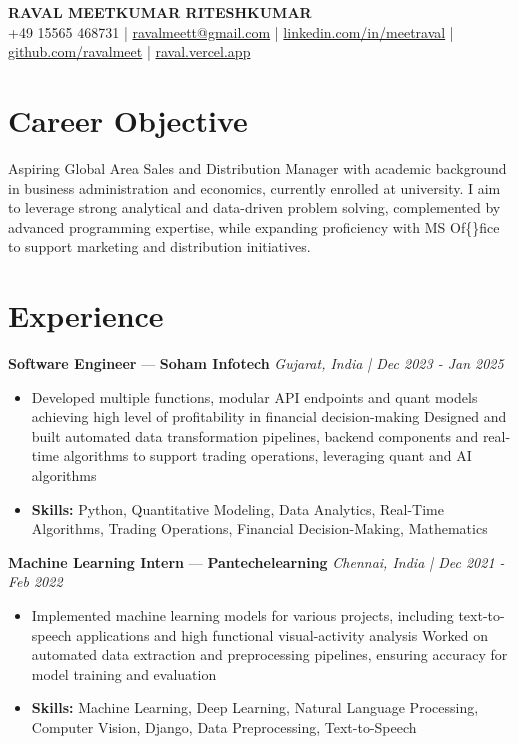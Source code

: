 \documentclass[a4paper,10pt]{article}
\begin{document}
\begin{center}
  {\Large\bfseries RAVAL MEETKUMAR RITESHKUMAR}\\[2pt]
  {\small +49 15565 468731 \;|\; \href{mailto:ravalmeett@gmail.com}{ravalmeett@gmail.com} \;|\; \href{https://www.linkedin.com/in/meetraval/}{linkedin.com/in/meetraval} \;|\; \href{https://github.com/ravalmeet}{github.com/ravalmeet} \;|\; \href{https://raval.vercel.app/}{raval.vercel.app}}
\end{center}
\vspace{-3pt}

\section*{Career Objective}
Aspiring Global Area Sales and Distribution Manager with academic background in business administration and economics, currently enrolled at university. I aim to leverage strong analytical and data-driven problem solving, complemented by advanced programming expertise, while expanding proficiency with MS Of\{\}fice to support marketing and distribution initiatives.\par

\section*{Experience}
\textbf{Software Engineer} — \textbf{Soham Infotech} \hfill \textit{Gujarat, India \;|\; Dec 2023 - Jan 2025}\par
\vspace{1pt}
\begin{itemize}
  \item Developed multiple functions, modular API endpoints and quant models achieving high level of profitability in financial decision-making Designed and built automated data transformation pipelines, backend components and real-time algorithms to support trading operations, leveraging quant and AI algorithms
  \item \textbf{Skills:} Python, Quantitative Modeling, Data Analytics, Real-Time Algorithms, Trading Operations, Financial Decision-Making, Mathematics
\end{itemize}
\vspace{3pt}
\textbf{Machine Learning Intern} — \textbf{Pantechelearning} \hfill \textit{Chennai, India \;|\; Dec 2021 - Feb 2022}\par
\vspace{1pt}
\begin{itemize}
  \item Implemented machine learning models for various projects, including text-to-speech applications and high functional visual-activity analysis Worked on automated data extraction and preprocessing pipelines, ensuring accuracy for model training and evaluation
  \item \textbf{Skills:} Machine Learning, Deep Learning, Natural Language Processing, Computer Vision, Django, Data Preprocessing, Text-to-Speech
\end{itemize}
\end{document}
